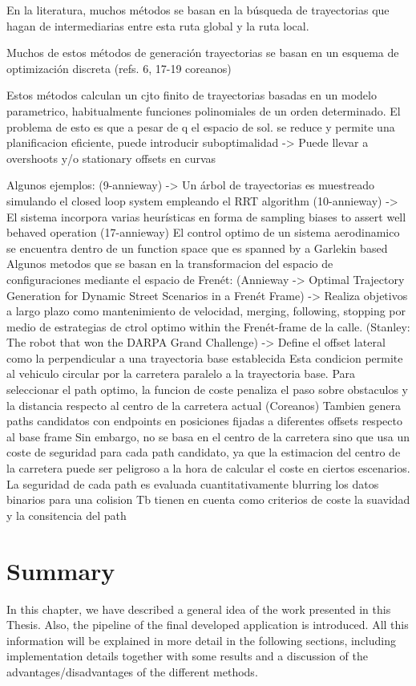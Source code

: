 En la literatura, muchos métodos se basan en la búsqueda de trayectorias que hagan de intermediarias entre esta ruta global y la ruta local.

Muchos de estos métodos de generación trayectorias se basan en un esquema de optimización discreta (refs. 6, 17-19 coreanos)

Estos métodos calculan un cjto finito de trayectorias basadas en un modelo parametrico, habitualmente funciones polinomiales de un orden determinado. El problema de esto es que a pesar de q el espacio de sol. se reduce y permite una planificacion eficiente, puede introducir suboptimalidad -> Puede llevar a overshoots y/o stationary offsets en curvas

Algunos ejemplos:
(9-annieway) -> Un árbol de trayectorias es muestreado simulando el closed loop system empleando el RRT algorithm
(10-annieway) -> El sistema incorpora varias heurísticas en forma de sampling biases to assert well behaved operation
(17-annieway) El control optimo de un sistema aerodinamico se encuentra dentro de un function space que es spanned by a Garlekin based
Algunos metodos que se basan en la transformacion del espacio de configuraciones mediante el espacio de Frenét:
(Annieway -> Optimal Trajectory Generation for Dynamic Street Scenarios in a Frenét Frame) -> Realiza objetivos a largo plazo como mantenimiento de velocidad, merging, following, stopping por medio de estrategias de ctrol optimo within the Frenét-frame de la calle.
(Stanley: The robot that won the DARPA Grand Challenge) -> Define el offset lateral como la perpendicular a una trayectoria base establecida
  Esta condicion permite al vehiculo circular por la carretera paralelo a la trayectoria base.
  Para seleccionar el path optimo, la funcion de coste penaliza el paso sobre obstaculos y la distancia respecto al centro de la carretera actual
(Coreanos) Tambien genera paths candidatos con endpoints en posiciones fijadas a diferentes offsets respecto al base frame
  Sin embargo, no se basa en el centro de la carretera sino que usa un coste de seguridad para cada path candidato, ya que la estimacion del centro de la carretera puede ser peligroso a la hora de calcular el coste en ciertos escenarios.
  La seguridad de cada path es evaluada cuantitativamente blurring los datos binarios para una colision
  Tb tienen en cuenta como criterios de coste la suavidad y la consitencia del path



\section{Summary}\label{ch:chapter01_03}

In this chapter, we have described a general idea of the work presented in this Thesis. Also, the pipeline of the final developed application is introduced. All this information will be explained in more detail in the following sections, including implementation details together with some results and a discussion of the advantages/disadvantages of the different methods.

